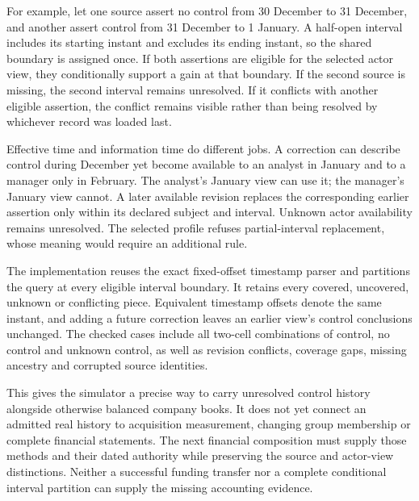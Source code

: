 For example, let one source assert no control from 30 December to 31 December,
and another assert control from 31 December to 1 January. A half-open interval
includes its starting instant and excludes its ending instant, so the shared
boundary is assigned once. If both assertions are eligible for the selected
actor view, they conditionally support a gain at that boundary. If the second
source is missing, the second interval remains unresolved. If it conflicts
with another eligible assertion, the conflict remains visible rather than being
resolved by whichever record was loaded last.

Effective time and information time do different jobs. A correction can describe
control during December yet become available to an analyst in January and to
a manager only in February. The analyst's January view can use it; the manager's
January view cannot. A later available revision replaces the corresponding
earlier assertion only within its declared subject and interval. Unknown actor
availability remains unresolved. The selected profile refuses partial-interval
replacement, whose meaning would require an additional rule.

The implementation reuses the exact fixed-offset timestamp parser and partitions
the query at every eligible interval boundary. It retains every covered,
uncovered, unknown or conflicting piece. Equivalent timestamp offsets denote
the same instant, and adding a future correction leaves an earlier view's
control conclusions unchanged. The checked cases include all two-cell combinations
of control, no control and unknown control, as well as revision conflicts,
coverage gaps, missing ancestry and corrupted source identities.

This gives the simulator a precise way to carry unresolved control history
alongside otherwise balanced company books. It does not yet connect an admitted
real history to acquisition measurement, changing group membership or complete
financial statements. The next financial composition must supply those methods
and their dated authority while preserving the source and actor-view distinctions.
Neither a successful funding transfer nor a complete conditional interval
partition can supply the missing accounting evidence.
